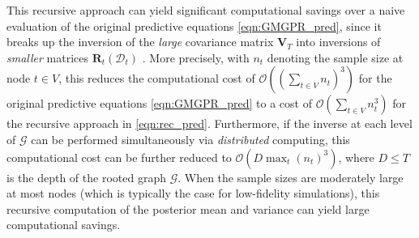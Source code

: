 \documentclass[12pt]{article}
\newcommand{\bs}[1]{\boldsymbol{#1}}
\newcommand{\cbl}[1]{{\color{black}{#1}}}
\begin{document}
This recursive approach can yield significant computational savings over a naive evaluation of the original predictive equations \eqref{eqn:GMGPR_pred}, since it breaks up the inversion of the \textit{large} covariance matrix $\bs{V}_T$ into inversions of \textit{smaller} matrices $\bs{R}_t(\mathcal{D}_t)$ \cbl{at each depth level of $\mathcal{G}$}. More precisely, with $n_t$ denoting the sample size at node $t \in V$, this reduces the computational cost of $\mathcal{O}((\sum_{t\in V}n_t)^3)$ for the original predictive equations \eqref{eqn:GMGPR_pred} to a cost of $\mathcal{O}(\sum_{t\in V}n_t^3)$ for the recursive approach in \eqref{eqn:rec_pred}. Furthermore, if the inverse at each level of $\mathcal{G}$ can be performed simultaneously via \textit{distributed} computing, this computational cost can be further reduced to $\mathcal{O}(D \max_t(n_t)^3)$, where $D \leq T$ is the depth of the rooted graph $\mathcal{G}$. When the sample sizes are moderately large at most nodes (which is typically the case for low-fidelity simulations), this recursive computation of the posterior mean and variance \cbl{at each depth level} can yield large computational savings.
\end{document}
